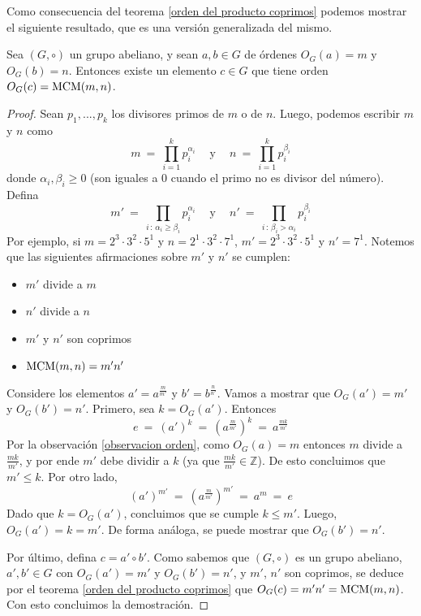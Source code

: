 Como consecuencia del teorema \ref{orden del producto coprimos} podemos mostrar el siguiente resultado, que es una versión generalizada del mismo.
\begin{corollary}\label{corolario orden}
Sea $(G,\circ)$ un grupo abeliano, y sean $a,b\in G$ de órdenes $O_G(a)=m$ y $O_G(b)=n$. Entonces existe un elemento $c\in G$ que tiene orden $O_G(c)={\rm MCM}(m,n)$.
\end{corollary}
\begin{proof}
Sean $p_1,...,p_k$ los divisores primos de $m$ o de $n$. Luego, podemos escribir $m$ y $n$ como 
$$m \ = \ \prod\limits_{i=1}^k p_i^{\alpha_i} \ \quad\text{y}\quad \ n \ = \ \prod\limits_{i=1}^k p_i^{\beta_i}$$ donde $\alpha_i,\beta_i \geq 0$ (son iguales a 0 cuando el primo no es divisor del número). Defina
$$m' \ = \ \prod\limits_{i\,:\,\alpha_i\geq \beta_i} p_i^{\alpha_i} \ \quad\text{y}\quad \ n' \ = \ \prod\limits_{i\,:\,\beta_i> \alpha_i} p_i^{\beta_i}$$
Por ejemplo, si $m=2^3\cdot 3^2\cdot 5^1$ y $n=2^1\cdot 3^2\cdot 7^1$, $m' = 2^3\cdot 3^2\cdot 5^1$ y $n' = 7^1$. Notemos que las siguientes afirmaciones sobre $m'$ y $n'$ se cumplen:
\begin{itemize}
	\item $m'$ divide a $m$
	\item $n'$ divide a $n$
	\item $m'$ y $n'$ son coprimos
	\item ${\rm MCM}(m,n) = m'n'$
\end{itemize}
Considere los elementos $a' = a^{\frac{m}{m'}}$ y $b' = b^{\frac{n}{n'}}$. Vamos a mostrar que $O_G(a')=m'$ y $O_G(b')=n'$. Primero, sea $k=O_G(a')$. Entonces $$e\ = \ (a')^k\ = \ (a^{\frac{m}{m'}})^k \ = \ a^{\frac{mk}{m'}}$$
Por la observación \ref{observacion orden}, como $O_G(a) = m$ entonces $m$ divide a $\frac{mk}{m'}$, y por ende $m'$ debe dividir a $k$ (ya que $\frac{mk}{m'}\in \mathbb{Z}$). De esto concluimos que $m'\leq k$. Por otro lado, $$(a')^{m'} \ = \ (a^{\frac{m}{m'}})^{m'} \ = \ a^m \ = \ e$$ 
Dado que $k=O_G(a')$, concluimos que se cumple $k\leq m'$. Luego, $O_G(a')=k=m'$. De forma análoga, se puede mostrar que $O_G(b')=n'$.


Por último, defina $c=a'\circ b'$. Como sabemos que $(G,\circ)$ es un grupo abeliano, $a',b'\in G$ con $O_G(a') = m'$ y $O_G(b')= n'$, y $m'$, $n'$ son coprimos, se deduce por el teorema \ref{orden del producto coprimos} que $O_G(c) = m'n' = {\rm MCM}(m,n)$. Con esto concluimos la demostración.
\end{proof}
